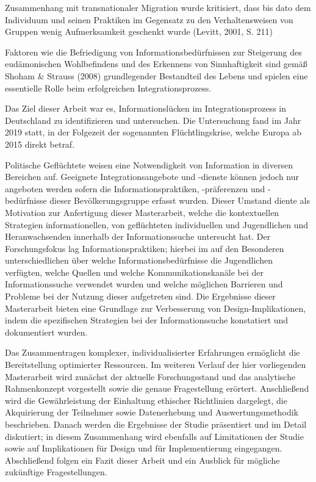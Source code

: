 Zusammenhang mit transnationaler Migration wurde kritisiert, dass bis
dato dem Individuum und seinen Praktiken im Gegensatz zu den
Verhaltensweisen von Gruppen wenig Aufmerksamkeit geschenkt wurde
(Levitt, 2001, S. 211)

Faktoren wie die Befriedigung von Informationsbedürfnissen zur
Steigerung des eudämonischen Wohlbefindens und des Erkennens von
Sinnhaftigkeit sind gemäß Shoham \& Strauss (2008) grundlegender
Bestandteil des Lebens und spielen eine essentielle Rolle beim
erfolgreichen Integrationsprozess.

Das Ziel dieser Arbeit war es, Informationslücken im Integrationsprozess in Deutschland zu identifizieren und untersuchen.\newline
Die Untersuchung fand im Jahr 2019 statt, in der Folgezeit der sogenannten Fl\"uchtlingskrise, welche Europa ab 2015 direkt betraf. \cite{unhcr2015seven}\newline


Politische Geflüchtete weisen eine Notwendigkeit von Information in
diversen Bereichen auf. Geeignete Integrationsangebote und -dienste
können jedoch nur angeboten werden sofern die Informationspraktiken,
-präferenzen und -bedürfnisse dieser Bevölkerungsgruppe erfasst
wurden. Dieser Umstand diente als Motivation zur Anfertigung dieser
Masterarbeit, welche die kontextuellen Strategien informationellen,
von geflüchteten individuellen und Jugendlichen und Heranwachsenden innerhalb der Informationssuche untersucht hat. Der Forschungsfokus lag Informationspraktiken;
hierbei im auf  den Besonderen unterschiedlichen über welche Informationsbedürfnisse die Jugendlichen verfügten, welche Quellen und welche Kommunikationskanäle bei der Informationssuche verwendet wurden und welche möglichen Barrieren und Probleme bei der Nutzung
dieser aufgetreten sind. Die Ergebnisse dieser Masterarbeit bieten eine
Grundlage zur Verbesserung von Design-Implikationen, indem die
spezifischen Strategien bei der Informationssuche konstatiert und
dokumentiert wurden.


Das Zusammentragen komplexer,
individualisierter Erfahrungen ermöglicht die Bereitstellung optimierter
Ressourcen. Im weiteren Verlauf der hier vorliegenden Masterarbeit wird zunächst
der aktuelle Forschungsstand und das analytische Rahmenkonzept
vorgestellt sowie die genaue Fragestellung erörtert. Anschließend wird
die Gewährleistung der Einhaltung ethischer Richtlinien dargelegt, die
Akquirierung der Teilnehmer sowie Datenerhebung und
Auswertungsmethodik beschrieben. Danach werden die Ergebnisse der
Studie präsentiert und im Detail diskutiert; in diesem Zusammenhang
wird ebenfalls auf Limitationen der Studie sowie auf Implikationen für
Design und für Implementierung eingegangen. Abschließend folgen ein
Fazit dieser Arbeit und ein Ausblick für mögliche zukünftige
Fragestellungen.

